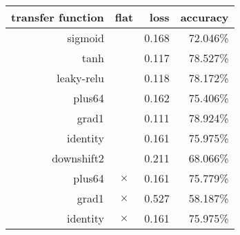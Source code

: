 \begin{tabular}{rcrr}
{\bf transfer function} & {\bf flat} & {\bf loss} & {\bf accuracy} \\
\hline
sigmoid &   & 0.168 & 72.046\% \\
tanh &   & 0.117 & 78.527\% \\
leaky-relu &   & 0.118 & 78.172\% \\
plus64 &   & 0.162 & 75.406\% \\
grad1 &   & 0.111 & 78.924\% \\
identity &   & 0.161 & 75.975\% \\
downshift2 &   & 0.211 & 68.066\% \\
plus64 & $\times$ & 0.161 & 75.779\% \\
grad1 & $\times$ & 0.527 & 58.187\% \\
identity & $\times$ & 0.161 & 75.975\% \\
\end{tabular}
